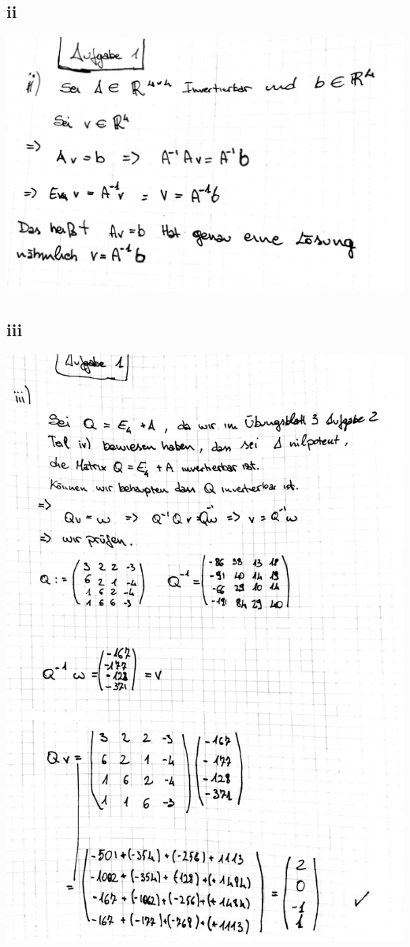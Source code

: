 \documentclass[12pt,a4paper]{article}
\begin{document}
\subsection{ii}
\includegraphics[scale=0.2]{lat4b_2.jpg} 
\newpage
\subsection{iii}
\includegraphics[scale=0.2]{lat4b_1.jpg} 
\newpage
\end{document}
